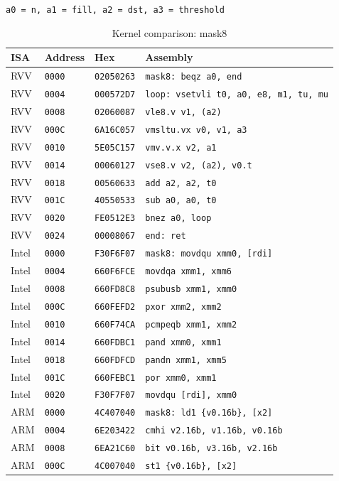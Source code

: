 \begin{table}[htbp]
\centering
\caption{Kernel comparison: mask8}
\begingroup
\scriptsize
\setlength{\tabcolsep}{4pt}
\noindent \texttt{a0 = n, a1 = fill, a2 = dst, a3 = threshold}\par
\vspace{0.6ex}
\begin{tabular}{@{}l|l|l|p{7.2cm}@{}}
\toprule
ISA & Address & Hex & Assembly \\
\midrule
RVV & \texttt{0000} & \texttt{02050263} & \texttt{mask8: beqz a0, end} \\
RVV & \texttt{0004} & \texttt{000572D7} & \texttt{loop: vsetvli t0, a0, e8, m1, tu, mu} \\
RVV & \texttt{0008} & \texttt{02060087} & \texttt{vle8.v v1, (a2)} \\
RVV & \texttt{000C} & \texttt{6A16C057} & \texttt{vmsltu.vx v0, v1, a3} \\
RVV & \texttt{0010} & \texttt{5E05C157} & \texttt{vmv.v.x v2, a1} \\
RVV & \texttt{0014} & \texttt{00060127} & \texttt{vse8.v v2, (a2), v0.t} \\
RVV & \texttt{0018} & \texttt{00560633} & \texttt{add a2, a2, t0} \\
RVV & \texttt{001C} & \texttt{40550533} & \texttt{sub a0, a0, t0} \\
RVV & \texttt{0020} & \texttt{FE0512E3} & \texttt{bnez a0, loop} \\
RVV & \texttt{0024} & \texttt{00008067} & \texttt{end: ret} \\
\midrule
Intel & \texttt{0000} & \texttt{F30F6F07} & \texttt{mask8: movdqu xmm0, [rdi]} \\
Intel & \texttt{0004} & \texttt{660F6FCE} & \texttt{movdqa xmm1, xmm6} \\
Intel & \texttt{0008} & \texttt{660FD8C8} & \texttt{psubusb xmm1, xmm0} \\
Intel & \texttt{000C} & \texttt{660FEFD2} & \texttt{pxor xmm2, xmm2} \\
Intel & \texttt{0010} & \texttt{660F74CA} & \texttt{pcmpeqb xmm1, xmm2} \\
Intel & \texttt{0014} & \texttt{660FDBC1} & \texttt{pand xmm0, xmm1} \\
Intel & \texttt{0018} & \texttt{660FDFCD} & \texttt{pandn xmm1, xmm5} \\
Intel & \texttt{001C} & \texttt{660FEBC1} & \texttt{por xmm0, xmm1} \\
Intel & \texttt{0020} & \texttt{F30F7F07} & \texttt{movdqu [rdi], xmm0} \\
\midrule
ARM & \texttt{0000} & \texttt{4C407040} & \texttt{mask8: ld1 \{v0.16b\}, [x2]} \\
ARM & \texttt{0004} & \texttt{6E203422} & \texttt{cmhi v2.16b, v1.16b, v0.16b} \\
ARM & \texttt{0008} & \texttt{6EA21C60} & \texttt{bit v0.16b, v3.16b, v2.16b} \\
ARM & \texttt{000C} & \texttt{4C007040} & \texttt{st1 \{v0.16b\}, [x2]} \\
\bottomrule
\end{tabular}
\endgroup
\end{table}
\noindent{}\par
